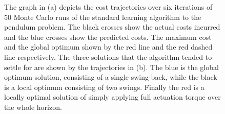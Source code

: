 \begin{figure}[t!]
{
\label{fig:standj1}
}
\caption{The graph in (a) depicts the cost trajectories over six iterations of 50 Monte Carlo runs of the standard learning algorithm to the pendulum problem. The black crosses show the actual costs incurred and the blue crosses show the predicted costs. The maximum cost and the global optimum shown by the red line and the red dashed line respectively. The three solutions that the algorithm tended to settle for are shown by the trajectories in (b). The blue is the global optimum solution, consisting of a single swing-back, while the black is a local optimum consisting of two swings. Finally the red is a locally optimal solution of simply applying full actuation torque over the whole horizon.}
\label{fig:stand1}
\end{figure}




